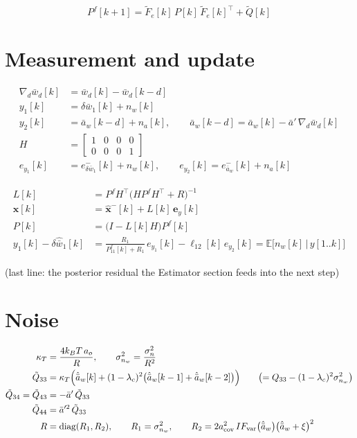 \documentclass[11pt,a4paper,fontset=none]{ctexart}
\newcommand{\ba}{\bar{a}}
\newcommand{\bw}{\bar{w}}
\newcommand{\E}{\mathbb{E}}
\newcommand{\ap}{\ba'}
\begin{document}
\begin{equation*}
P^{f}[k+1] = \tilde{F}_e[k]\,P[k]\,\tilde{F}_e[k]^{\top} + \tilde{Q}[k]
\end{equation*}

\section{Measurement and update}

\begin{align*}
\nabla_d\bw_d[k] &= \bw_d[k] - \bw_d[k-d] \\
y_1[k] &= \delta\bw_1[k] + n_w[k] \\
y_2[k] &= \ba_w[k-d] + n_a[k], \qquad \ba_w[k-d] = \ba_w[k] - \ap\,\nabla_d\bw_d[k] \\
H &= \begin{bmatrix} 1 & 0 & 0 & 0 \\ 0 & 0 & 0 & 1 \end{bmatrix} \\
e_{y_1}[k] &= e^{-}_{\delta\bw_1}[k] + n_w[k], \qquad e_{y_2}[k] = e^{-}_{\ba_w}[k] + n_a[k]
\end{align*}

\begin{align*}
L[k]         &= P^{f}H^{\top}\bigl(HP^{f}H^{\top} + R\bigr)^{-1} \\
\hat{\mathbf{x}}[k] &= \hat{\mathbf{x}}^{-}[k] + L[k]\,\mathbf{e}_y[k] \\
P[k]         &= \bigl(I - L[k]H\bigr)P^{f}[k] \\
y_1[k] - \delta\hat{\bw}_1[k] &= \frac{R_1}{P^{f}_{11}[k] + R_1}\,e_{y_1}[k] - \ell_{12}[k]\,e_{y_2}[k]
   = \E\bigl[n_w[k]\,\big|\,y[1..k]\bigr]
\end{align*}

(last line: the posterior residual the Estimator section feeds into the next step)

\section{Noise}

\begin{align*}
\kappa_T &= \frac{4k_BT\,a_o}{R}, \qquad \sigma^{2}_{n_w} = \frac{\sigma^{2}_{n}}{R^{2}} \\
\tilde{Q}_{33} &= \kappa_T\Bigl(\hat{\ba}_w[k] + (1-\lambda_c)^{2}\bigl(\hat{\ba}_w[k-1] + \hat{\ba}_w[k-2]\bigr)\Bigr)
   \qquad \bigl(= Q_{33} - (1-\lambda_c)^{2}\sigma^{2}_{n_w}\bigr) \\
\tilde{Q}_{34} = \tilde{Q}_{43} &= -\ap\,\tilde{Q}_{33} \\
\tilde{Q}_{44}   &= \ap^{2}\,\tilde{Q}_{33} \\
R        &= \mathrm{diag}(R_1, R_2), \qquad R_1 = \sigma^{2}_{n_w}, \qquad
R_2 = 2a_{\mathrm{cov}}^{2}\,IF_{\mathrm{var}}\bigl(\hat{\ba}_w\bigr)\bigl(\hat{\ba}_w + \xi\bigr)^{2}
\end{align*}
\end{document}

